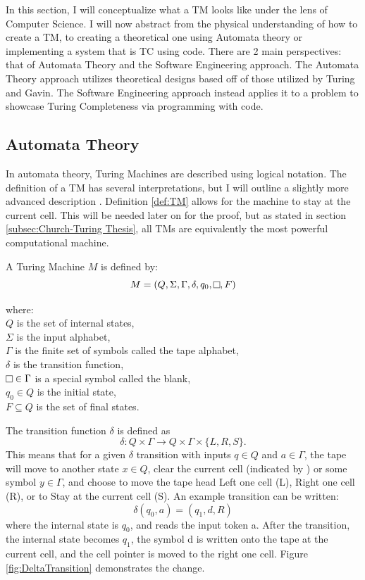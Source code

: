 In this section, I will conceptualize what a TM looks like under the lens of Computer Science.
I will now abstract from the physical understanding of how to create a TM, to creating a theoretical one using Automata theory or implementing a system that is TC using code.
There are 2 main perspectives: that of Automata Theory and the Software Engineering approach.
The Automata Theory approach utilizes theoretical designs based off of those utilized by Turing and Gavin.
The Software Engineering approach instead applies it to a problem to showcase Turing Completeness via programming with code.

\subsection{Automata Theory}\label{subsec:AutomataThy}

In automata theory, Turing Machines are described using logical notation.
The definition of a TM has several interpretations, but I will outline a slightly more advanced description \cite{IntroFormLangAuto,TuBB}.
Definition \ref{def:TM} allows for the machine to stay at the current cell.
This will be needed later on for the proof, but as stated in section \ref{subsec:Church-Turing Thesis}, all TMs are equivalently the most powerful computational machine.

\begin{definition}
    \label{def:TM}
    A Turing Machine $M$ is defined by:
        \[M = (Q, \Sigma ,\Gamma, \delta, q_{0}, \raisebox{0.1cm}{\fbox{}}, F)\]
        \par \hangindent=3cm 
        where: \\
        \( Q \) is the set of internal states,\\
        \( \Sigma \) is the input alphabet,\\
        \( \Gamma \) is the finite set of symbols called the tape alphabet,\\
        \( \delta \) is the transition function,\\
        \( \raisebox{0.1cm}{\fbox{}} \in \Gamma \) is a special symbol called the blank,\\
        \( q_{0} \in Q \) is the initial state,\\
        \( F \subseteq Q \) is the set of final states.
\end{definition}

The transition function $\delta$ is defined as \[\delta: Q \times \Gamma \rightarrow Q \times \Gamma \times \{L, R, S\}.\]
This means that for a given $\delta$ transition with inputs $q \in Q$ and $a \in \Gamma$, the tape will move to another state $x \in Q$, clear the current cell (indicated by \raisebox{0.1cm}{\fbox{}}) or some symbol $y \in \Gamma$, and choose to move the tape head Left one cell (L), Right one cell (R), or to Stay at the current cell (S).
An example transition can be written: \[\delta(q_{0}, a) = (q_{1}, d, R)\] where the internal state is $q_{0}$, and reads the input token a.
After the transition, the internal state becomes $q_{1}$, the symbol d is written onto the tape at the current cell, and the cell pointer is moved to the right one cell.
Figure \ref{fig:DeltaTransition} demonstrates the change.

